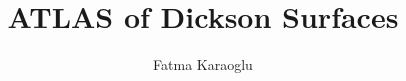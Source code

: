\documentclass{article}
\newcommand\setTBstruts{\def\T{\rule{0pt}{2.6ex}}%
\def\B{\rule[-1.2ex]{0pt}{0pt}}}
\begin{document}
 
\setTBstruts



{\allowdisplaybreaks%






\title{ATLAS of Dickson Surfaces}
\author{Fatma Karaoglu}%
\maketitle%
%



}
\end{document}
